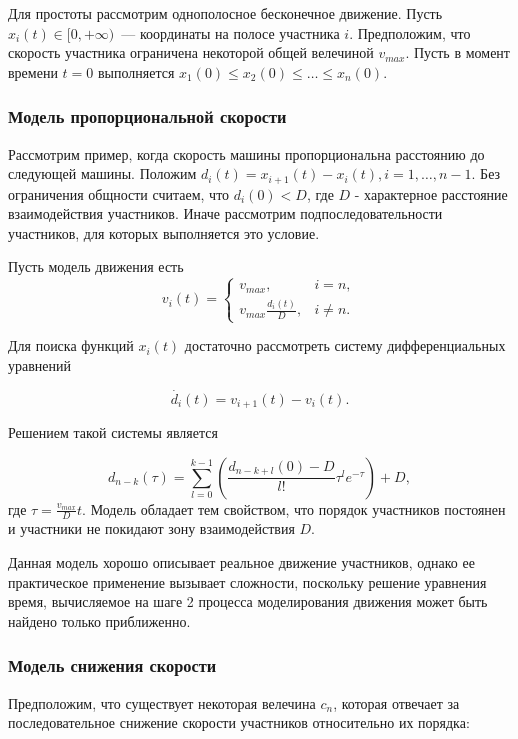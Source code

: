\documentclass[12pt, a4paper]{article}
\begin{document}
Для простоты рассмотрим однополосное бесконечное движение. Пусть ${x_i(t) \in [0, +\infty)}$~--- координаты на полосе участника $i$. Предположим, что скорость участника ограничена некоторой общей велечиной $v_{max}$. Пусть в момент времени ${t = 0}$ выполняется $x_1(0) \le x_2(0) \le \dots \le x_n(0)$.

\subsubsection*{Модель пропорциональной скорости}
Рассмотрим пример, когда скорость машины пропорциональна расстоянию до следующей машины.
Положим $d_{i} (t) = x_{i + 1} (t) - x_{i} (t), i = 1, \dots, n - 1$.
Без ограничения общности считаем, что  $d_{i} (0) < D$, где $D$ - характерное расстояние взаимодействия участников. Иначе рассмотрим подпоследовательности участников, для которых выполняется это условие.

Пусть модель движения есть
\begin{equation}
	\label{eq:micro}
	v_i(t)=
	\begin{cases}
		v_{max}, & i = n,
		\\
		v_{max} \frac{d_i(t)}{D} ,& i \ne n.
	\end{cases}
\end{equation}

Для поиска функций $x_i(t)$ достаточно рассмотреть систему дифференциальных уравнений

$$ \dot{d_i} (t) = v_{i + 1} (t) - v_i (t).$$

Решением такой системы является

$$d_{n - k} (\tau) = \sum \limits_{l = 0} ^ {k - 1} \left(\frac{d_{n - k + l} (0) - D}{l!} \tau^l e ^ {-\tau}\right) + D ,$$
где ${\tau = \frac{v_{max}}{D}t}$. Модель обладает тем свойством, что порядок участников постоянен и участники не покидают зону взаимодействия $D$. 

Данная модель хорошо описывает реальное движение участников, однако ее практическое применение вызывает сложности, поскольку решение уравнения время, вычисляемое на шаге 2 процесса моделирования движения может быть найдено только приближенно.

\subsubsection*{Модель снижения скорости}

Предположим, что существует некоторая велечина $c_n$, которая отвечает за последовательное снижение скорости участников относительно их порядка:
\end{document}
